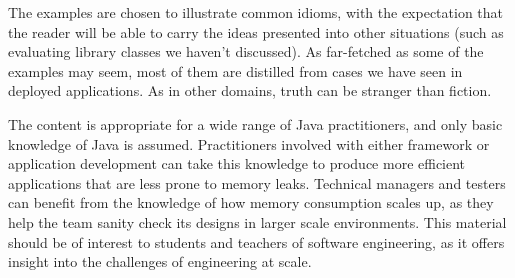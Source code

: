 The examples are chosen to illustrate common idioms, with the expectation that
the reader will be able to carry the ideas presented into other situations
(such as evaluating library classes we haven't discussed). As far-fetched as
some of the examples may seem, most of them are distilled from cases we have seen 
in deployed applications. As in other domains, truth can be stranger than
fiction.

The content is appropriate for a wide range of Java practitioners, and only
basic knowledge of Java is assumed.
Practitioners involved with either framework or application development can
take this knowledge to produce more efficient applications that are less prone to
memory leaks.
Technical managers and testers can benefit from the knowledge of how memory
consumption scales up, as they help the team sanity check its designs in larger
scale environments.
This material should be of interest to students and teachers of software
engineering, as it offers insight into the challenges of engineering at scale.

